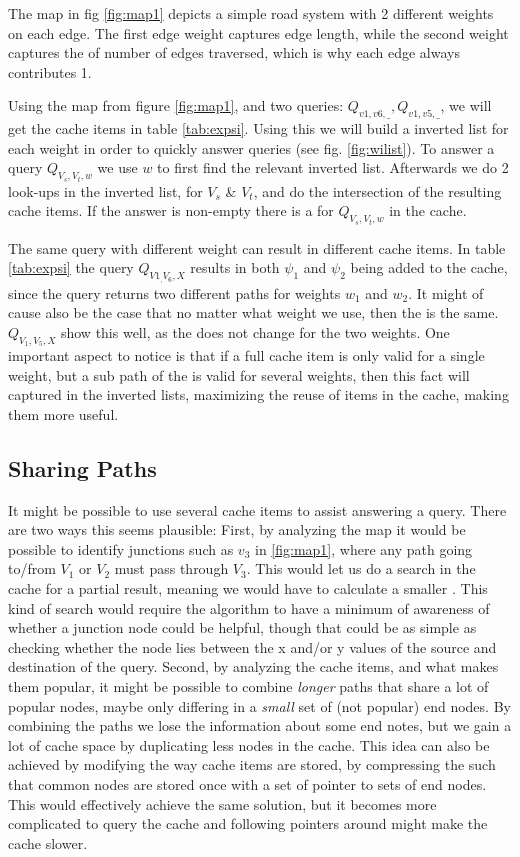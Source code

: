 The map in  fig \ref{fig:map1} depicts a simple road system with 2 different weights on each edge. The first edge weight captures edge length, while the second weight captures the of number of edges traversed, which is why each edge always contributes 1.

Using the map from figure \ref{fig:map1}, and two queries: $Q_{v1,v6,\_}, Q_{v1,v5,\_}$, we will get the cache items in table \ref{tab:expsi}. Using this we will build a inverted list for each weight in order to quickly answer queries (see fig. \ref{fig:wilist}). 
To answer a query $Q_{V_s,V_t,w}$ we use $w$ to first find the relevant inverted list. Afterwards we do 2 look-ups in the inverted list, for $V_s$ \& $V_t$, and do the intersection of the resulting cache items. If the answer is non-empty there is a \spath for $Q_{V_s,V_t,w}$ in the cache.

The same query with different weight can result in different cache items. In table \ref{tab:expsi} the query $Q_{V1_,V_6,X}$ results in both $\psi_1$ and $\psi_2$ being added to the cache, since the query returns two different paths for weights $w_1$ and $w_2$. It might of cause also be the case that no matter what weight we use, then the \spath is the same. $Q_{V_1,V_5,X}$ show this well, as the \spath does not change for the two weights. One important aspect to notice is that if a full cache item is only valid for a single weight, but a sub path of the \spath is valid for several weights, then this fact will captured in the inverted lists, maximizing the reuse of items in the cache, making them more useful. 


\subsection{Sharing Paths}
It might be possible to use several cache items to assist answering a query. There are two ways this seems plausible:
First, by analyzing the map it would be possible to identify junctions such as $v_3$ in \ref{fig:map1}, where any path going to/from $V_1$ or $V_2$ must pass through $V_3$. This would let us do a search in the cache for a partial result, meaning we would have to calculate a smaller \spath. This kind of search would require the \spath algorithm to have a minimum of awareness of whether a junction node could be helpful, though that could be as simple as checking whether the node lies between the x and/or y values of the source and destination of the query.
Second, by analyzing the cache items, and what makes them popular, it might be possible to combine \textit{longer} paths that share a lot of popular nodes, maybe only differing in a \textit{small} set of (not popular) end nodes. By combining the paths we lose the information about some end notes, but we gain a lot of cache space by duplicating less nodes in the cache.
This idea can also be achieved by modifying the way cache items are stored, by compressing the \spaths such that common nodes are stored once with a set of pointer to sets of end nodes. This would effectively achieve the same solution, but it becomes more complicated to query the cache and following pointers around might make the cache slower.


